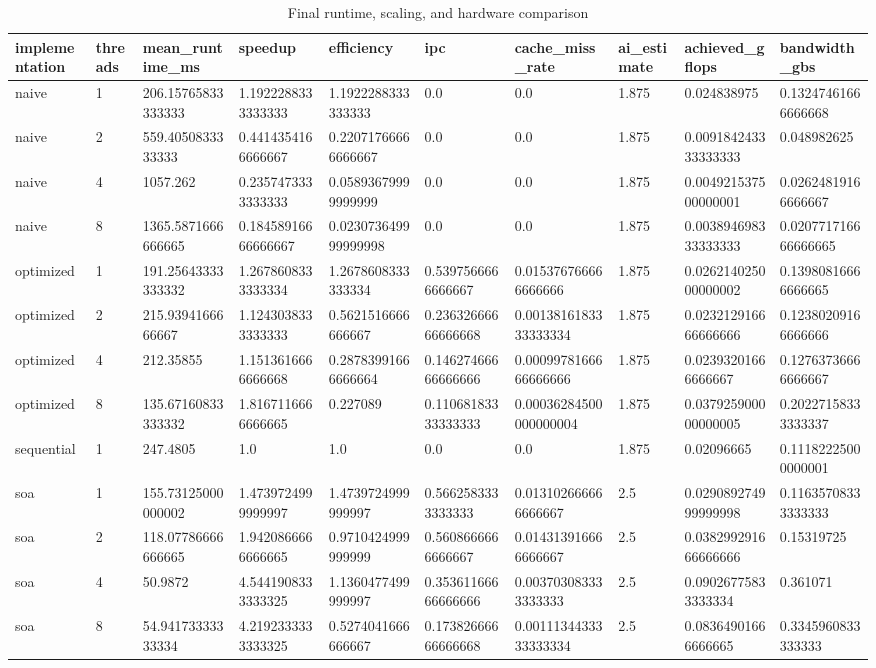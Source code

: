 \begin{table}[ht]
\centering
\small
\begin{tabular}{llllllllll}
\hline
implementation & threads & mean_runtime_ms & speedup & efficiency & ipc & cache_miss_rate & ai_estimate & achieved_gflops & bandwidth_gbs \\ 
\hline
naive & 1 & 206.15765833333333 & 1.1922288333333333 & 1.1922288333333333 & 0.0 & 0.0 & 1.875 & 0.024838975 & 0.13247461666666668 \\ 
naive & 2 & 559.4050833333333 & 0.4414354166666667 & 0.22071766666666667 & 0.0 & 0.0 & 1.875 & 0.009184243333333333 & 0.048982625 \\ 
naive & 4 & 1057.262 & 0.2357473333333333 & 0.05893679999999999 & 0.0 & 0.0 & 1.875 & 0.004921537500000001 & 0.02624819166666667 \\ 
naive & 8 & 1365.5871666666665 & 0.18458916666666667 & 0.023073649999999998 & 0.0 & 0.0 & 1.875 & 0.003894698333333333 & 0.020771716666666665 \\ 
optimized & 1 & 191.25643333333332 & 1.2678608333333334 & 1.2678608333333334 & 0.5397566666666667 & 0.015376766666666666 & 1.875 & 0.026214025000000002 & 0.13980816666666665 \\ 
optimized & 2 & 215.9394166666667 & 1.1243038333333333 & 0.5621516666666667 & 0.23632666666666668 & 0.0013816183333333334 & 1.875 & 0.023212916666666666 & 0.12380209166666666 \\ 
optimized & 4 & 212.35855 & 1.1513616666666668 & 0.28783991666666664 & 0.14627466666666666 & 0.0009978166666666666 & 1.875 & 0.02393201666666667 & 0.12763736666666667 \\ 
optimized & 8 & 135.67160833333332 & 1.8167116666666665 & 0.227089 & 0.11068183333333333 & 0.00036284500000000004 & 1.875 & 0.037925900000000005 & 0.20227158333333337 \\ 
sequential & 1 & 247.4805 & 1.0 & 1.0 & 0.0 & 0.0 & 1.875 & 0.02096665 & 0.11182225000000001 \\ 
soa & 1 & 155.73125000000002 & 1.4739724999999997 & 1.4739724999999997 & 0.5662583333333333 & 0.013102666666666667 & 2.5 & 0.029089274999999998 & 0.11635708333333333 \\ 
soa & 2 & 118.07786666666665 & 1.9420866666666665 & 0.9710424999999999 & 0.5608666666666667 & 0.014313916666666667 & 2.5 & 0.038299291666666666 & 0.15319725 \\ 
soa & 4 & 50.9872 & 4.5441908333333325 & 1.1360477499999997 & 0.35361166666666666 & 0.003703083333333333 & 2.5 & 0.09026775833333334 & 0.361071 \\ 
soa & 8 & 54.94173333333334 & 4.2192333333333325 & 0.5274041666666667 & 0.17382666666666668 & 0.0011134433333333334 & 2.5 & 0.08364901666666665 & 0.3345960833333333 \\ 
\hline
\end{tabular}
\caption{Final runtime, scaling, and hardware comparison}
\label{tab:final_comparison}
\end{table}
